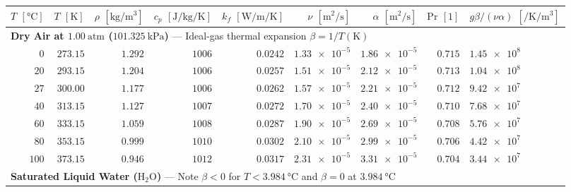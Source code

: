 \par\smallskip\noindent
\begin{minipage}{\linewidth}
\label{tab:11:air-water-props}
\footnotesize
\setlength{\tabcolsep}{4pt}
\renewcommand{\arraystretch}{1.12}
\begin{tabularx}{\linewidth}{@{}r r r r r r r r X@{}}
\toprule
$T$ $[\si{\celsius}]$ & $T$ $[\si{\kelvin}]$ & $\rho$ $[\si{\kilogram\per\cubic\meter}]$ & $c_p$ $[\si{\joule\per\kilogram\per\kelvin}]$ & $k_f$ $[\si{\watt\per\meter\per\kelvin}]$ & $\nu$ $[\si{\square\meter\per\second}]$ & $\alpha$ $[\si{\square\meter\per\second}]$ & $\mathrm{Pr}$ $[1]$ & $g\beta/(\nu\alpha)$ $[\si{\per\kelvin\per\cubic\meter}]$ \\
\midrule
\multicolumn{9}{l}{\textbf{Dry Air at $\SI{1.00}{\text{atm}}$ ($\SI{101.325}{\kilo\pascal}$)} --- Ideal-gas thermal expansion $\beta = 1/T(\si{\kelvin})$} \\
$0$   & $273.15$ & $1.292$ & $1006$ & $0.0242$ & $\num{1.33e-5}$ & $\num{1.86e-5}$ & $0.715$ & $\num{1.45e8}$ \\
$20$  & $293.15$ & $1.204$ & $1006$ & $0.0257$ & $\num{1.51e-5}$ & $\num{2.12e-5}$ & $0.713$ & $\num{1.04e8}$ \\
$27$  & $300.00$ & $1.177$ & $1006$ & $0.0262$ & $\num{1.57e-5}$ & $\num{2.21e-5}$ & $0.712$ & $\num{9.42e7}$ \\
$40$  & $313.15$ & $1.127$ & $1007$ & $0.0272$ & $\num{1.70e-5}$ & $\num{2.40e-5}$ & $0.710$ & $\num{7.68e7}$ \\
$60$  & $333.15$ & $1.059$ & $1008$ & $0.0287$ & $\num{1.90e-5}$ & $\num{2.69e-5}$ & $0.708$ & $\num{5.76e7}$ \\
$80$  & $353.15$ & $0.999$ & $1010$ & $0.0302$ & $\num{2.10e-5}$ & $\num{2.99e-5}$ & $0.706$ & $\num{4.42e7}$ \\
$100$ & $373.15$ & $0.946$ & $1012$ & $0.0317$ & $\num{2.31e-5}$ & $\num{3.31e-5}$ & $0.704$ & $\num{3.44e7}$ \\
\midrule
\multicolumn{9}{l}{\textbf{Saturated Liquid Water ($\mathrm{H_2O}$)} --- Note $\beta < 0$ for $T < \SI{3.984}{\celsius}$ and $\beta = 0$ at $\SI{3.984}{\celsius}$} \\

\end{tabularx}
\end{minipage}
